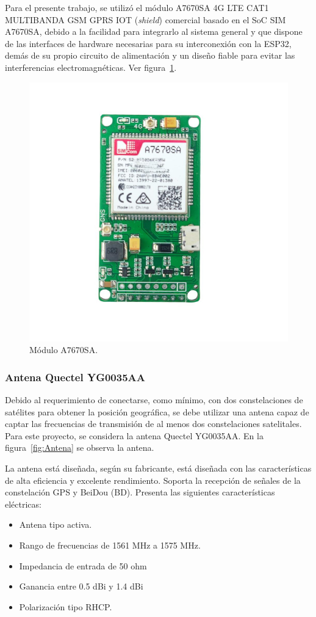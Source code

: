 Para el presente trabajo, se utilizó el módulo A7670SA 4G LTE CAT1 MULTIBANDA GSM GPRS IOT (\textit{shield}) comercial basado en el SoC SIM A7670SA, debido a la facilidad para integrarlo al sistema general y que dispone de las interfaces de hardware necesarias para su interconexión con la ESP32, demás de su propio circuito de alimentación y un diseño fiable para evitar las interferencias electromagnéticas. Ver figura~\ref{fig:A7670SA_2}.

\begin{figure}[htbp]
	\centering
	\includegraphics[width=.5\textwidth]{./Figures/A7670SA_Mod.jpg}
	\caption{Módulo A7670SA\protect\footnotemark.}
	\label{fig:A7670SA_2}
\end{figure}

\subsubsection{Antena Quectel YG0035AA}

Debido al requerimiento de conectarse, como mínimo, con dos constelaciones de satélites para obtener la posición geográfica, se debe utilizar una antena capaz de captar las frecuencias de transmisión de al menos dos constelaciones satelitales. Para este proyecto, se considera la antena Quectel YG0035AA. En la figura~\ref{fig:Antena} se observa la antena.

La antena está diseñada, según su fabricante, está diseñada con las características de alta eficiencia y excelente rendimiento. Soporta la recepción de señales de la constelación GPS y BeiDou (BD). Presenta las siguientes características eléctricas: 

\begin{itemize}
	\item Antena tipo activa.
	\item Rango de frecuencias de 1561 MHz a 1575 MHz.
	\item Impedancia de entrada de 50 ohm
	\item Ganancia entre 0.5 dBi y 1.4 dBi
	\item Polarización tipo RHCP. 
\end{itemize}


